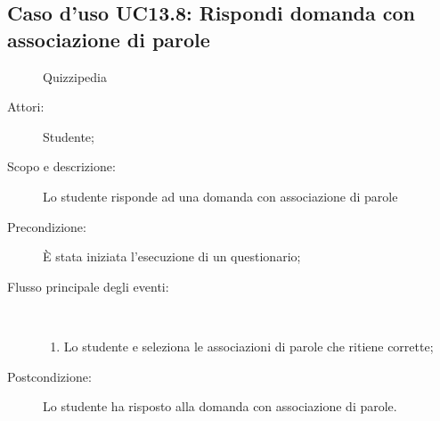 \subsection{Caso d'uso UC13.8: Rispondi domanda con associazione di parole}
	\begin{figure}[H]
		\centering
		\begin{resizedtikzpicture}{\textwidth}
		\begin{umlsystem}[x=0, fill=lightgray!20]{Quizzipedia}
		\end{umlsystem}
		\end{resizedtikzpicture}
		\caption{}
	\end{figure}
\begin{description}
\item[Attori:] Studente;
\item[Scopo e descrizione:] Lo studente risponde ad una domanda con associazione di parole
      \item[Precondizione:] È stata iniziata l'esecuzione di un questionario;

        \item[Flusso principale degli eventi:] \ 
 \begin{enumerate}
          \item Lo studente e seleziona le associazioni di parole che ritiene corrette;

      \end{enumerate}
    \item[Postcondizione:] Lo studente ha risposto alla domanda con associazione di parole.
  \end{description}
\hypertarget{UC13.9}{}
